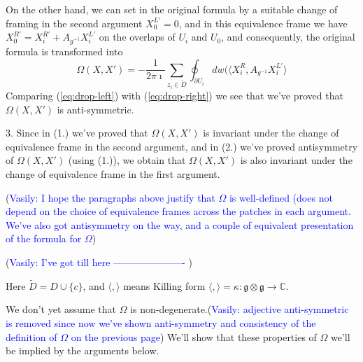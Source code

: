 \documentclass[11pt, oneside, reqno]{amsart}
\theoremstyle{definition} \newtheorem{definition}{Definition}[section]
\theoremstyle{definition} \newtheorem{remark}[definition]{Remark}
\theoremstyle{definition} \newtheorem{remarks}[definition]{Remarks}
\theoremstyle{definition} \newtheorem{question}[definition]{Question}
\theoremstyle{definition} \newtheorem*{note}{Note}
\theoremstyle{definition} \newtheorem{example}[definition]{Example}
\theoremstyle{definition} \newtheorem{examples}[definition]{Examples}
\renewcommand{\gg}{\mathfrak{g}}
\newcommand{\vasily}[1]{(\textcolor{blue}{Vasily: #1})}
\begin{document}
On the other hand, we can set in the original formula by a suitable change
of framing in the second argument $X_0^{L'} = 0$, and in this equivalence
frame we have $X_0^{R'} =  X_{i}^{R'}  + A_{g^{-1}} X_{i}^{L'}$ on the
overlaps of $U_i$ and $U_0$, and consequently, the original formula is transformed into
\begin{equation}
\label{eq:drop-left}
  \Omega(X, X') =   -\frac{1}{2 \pi \imath} \sum_{z_i \in \tilde D} \oint_{\partial U_i}  dw (
\langle  X^{R}_{i},  A_{g^{-1}} X_i^{L'} \rangle 
\end{equation}
Comparing (\ref{eq:drop-left}) with (\ref{eq:drop-right}) we see that we've proved that $\Omega(X,X')$ is anti-symmetric.


3. Since in (1.) we've proved that $\Omega(X,X')$ is invariant under
the change of equivalence frame in the second argument, and in (2.) we've proved
antisymmetry of $\Omega(X, X')$ (using (1.)), we obtain that $\Omega(X, X')$ is also
invariant under the change of equivalence frame in the first argument.

\vasily{I hope the paragraphs above justify that $\Omega$ is well-defined
  (does not depend on the choice of equivalence frames across the patches
  in each argument. We've also got antisymmetry on the way, and a couple
of equivalent presentation of the formula for $\Omega$} 

\vasily{I've got till here ----------------------  } 





Here $\tilde D = D \cup \{ c \}$, and $\langle, \rangle$ means Killing form $\langle, \rangle = \kappa: \gg \otimes \gg \to \mathbb{C}$.

We don't yet assume that $\Omega$ is non-degenerate.\vasily{adjective
  anti-symmetric is removed since now we've shown anti-symmetry
  and consistency of the definition of $\Omega$ on the previous page} We'll show
that these properties of $\Omega$  we'll be implied by the arguments below.
\end{document}
